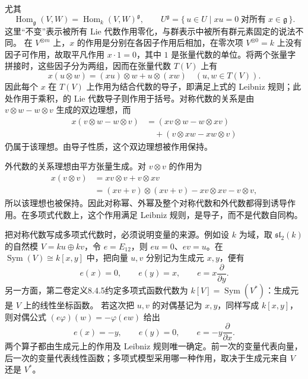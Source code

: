 尤其
\[
	\operatorname{Hom}_{\mathfrak g}(V,W) =\operatorname{Hom}_k(V,W)^{\mathfrak g}, \qquad U^{\mathfrak g}=\{\,u\in U\mid xu=0\;\text{对所有}\;x\in\mathfrak g\,\}.
\]
这里“不变”表示被所有 Lie 代数作用零化，与群表示中被所有群元素固定的说法不同。
\ProseParagraphBreak
在 \(V^{\otimes m}\) 上，\(x\) 的作用是分别在各因子作用后相加，在零次项 \(V^{\otimes0}=k\) 上没有因子可作用，故取平凡作用 \(x\cdot1=0\)，其中 \(1\) 是张量代数的单位。将两个张量字拼接时，这些因子分为两组，因而在张量代数 \(T(V)\) 上有
\[
	x(u\otimes w)=(xu)\otimes w+u\otimes(xw) \quad(u,w\in T(V)).
\]
因此每个 \(x\) 在 \(T(V)\) 上作用为结合代数的导子，即满足上式的 Leibniz 规则；此处作用于乘积，的 Lie 代数导子则作用于括号。对称代数的关系是由 \(v\otimes w-w\otimes v\) 生成的双边理想，而
\[
	\begin{aligned}
		x(v\otimes w-w\otimes v) &=(xv\otimes w-w\otimes xv)\\
		&\quad +(v\otimes xw-xw\otimes v)
	\end{aligned}
\]
仍属于该理想。由导子性质，这个双边理想被作用保持。

\ProseParagraphBreak

外代数的关系理想由平方张量生成。对 \(v\otimes v\) 的作用为
\[
	\begin{aligned}
		x(v\otimes v)&=xv\otimes v+v\otimes xv\\
		&=(xv+v)\otimes(xv+v)-xv\otimes xv-v\otimes v,
	\end{aligned}
\]
所以该理想也被保持。因此对称幂、外幂及整个对称代数和外代数都得到诱导作用。在多项式代数上，这个作用满足 Leibniz 规则，是导子，而不是代数自同构。

\ProseParagraphBreak

把对称代数写成多项式代数时，必须说明变量的来源。例如设 \(k\) 为域，取 \(\mathfrak{sl}_2(k)\) 的自然模 \(V=ku\oplus kv\)，令 \(e=E_{12}\)，则 \(eu=0\)、\(ev=u\)。在 \(\operatorname{Sym}(V)\cong k[x,y]\) 中，把向量 \(u,v\) 分别记为生成元 \(x,y\)，便有
\[
	e(x)=0,\qquad e(y)=x,\qquad e=x\frac{\partial}{\partial y}.
\]
另一方面，第二卷定义8.4.5约定多项式函数代数为 \(k[V]=\operatorname{Sym}(V^*)\)：生成元是 \(V\) 上的线性坐标函数。 若这次把 \(u,v\) 的对偶基记为 \(x,y\)，同样写成 \(k[x,y]\)，则对偶公式 \((e\varphi)(w)=-\varphi(ew)\) 给出
\[
	e(x)=-y,\qquad e(y)=0,\qquad e=-y\frac{\partial}{\partial x}.
\]
两个算子都由生成元上的作用及 Leibniz 规则唯一确定。前一次的变量代表向量，后一次的变量代表线性函数；多项式模型采用哪一种作用，取决于生成元来自 \(V\) 还是 \(V^*\)。

